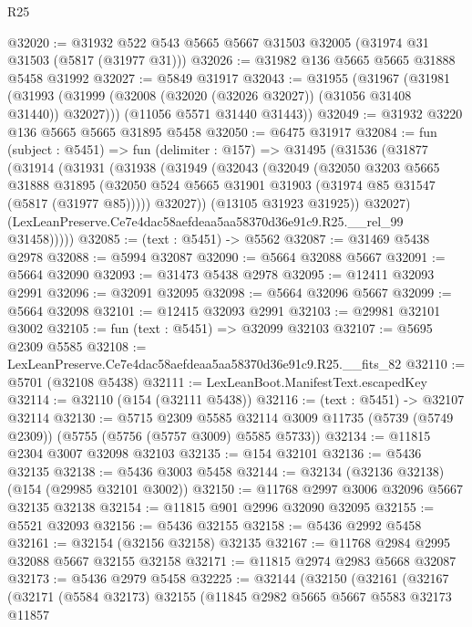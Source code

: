 \begin{lexlean}{R25}
\begin{coremodule}
@32020 := @31932 @522 @543 @5665 @5667 @31503 @32005 (@31974 @31 @31503 (@5817 (@31977 @31)))
@32026 := @31982 @136 @5665 @5665 @31888 @5458 @31992
@32027 := @5849 @31917
@32043 := @31955
    (@31967
      (@31981 (@31993 (@31999 (@32008 (@32020 (@32026 @32027)) (@31056 @31408 @31440)) @32027)))
      (@11056 @5571 @31440 @31443))
@32049 := @31932 @3220 @136 @5665 @5665 @31895 @5458
@32050 := @6475 @31917
@32084 := fun (subject : @5451) =>
  fun (delimiter : @157) =>
  @31495
    (@31536
      (@31877
        (@31914
          (@31931
            (@31938
              (@31949
                (@32043
                  (@32049
                    (@32050
                      @3203
                      @5665
                      @31888
                      @31895
                      (@32050 @524 @5665 @31901 @31903 (@31974 @85 @31547 (@5817 (@31977 @85)))))
                    @32027))
                (@13105 @31923 @31925))
              @32027)
            (LexLeanPreserve.Ce7e4dac58aefdeaa5aa58370d36e91c9.R25.__rel_99 @31458)))))
@32085 := (text : @5451) -> @5562
@32087 := @31469 @5438 @2978
@32088 := @5994 @32087
@32090 := @5664 @32088 @5667
@32091 := @5664 @32090
@32093 := @31473 @5438 @2978
@32095 := @12411 @32093 @2991
@32096 := @32091 @32095
@32098 := @5664 @32096 @5667
@32099 := @5664 @32098
@32101 := @12415 @32093 @2991
@32103 := @29981 @32101 @3002
@32105 := fun (text : @5451) => @32099 @32103
@32107 := @5695 @2309 @5585
@32108 := LexLeanPreserve.Ce7e4dac58aefdeaa5aa58370d36e91c9.R25.__fits_82
@32110 := @5701 (@32108 @5438)
@32111 := LexLeanBoot.ManifestText.escapedKey
@32114 := @32110 (@154 (@32111 @5438))
@32116 := (text : @5451) -> @32107 @32114
@32130 := @5715
    @2309
    @5585
    @32114
    @3009
    @11735
    (@5739 (@5749 @2309))
    (@5755 (@5756 (@5757 @3009) @5585 @5733))
@32134 := @11815 @2304 @3007 @32098 @32103
@32135 := @154 @32101
@32136 := @5436 @32135
@32138 := @5436 @3003 @5458
@32144 := @32134 (@32136 @32138) (@154 (@29985 @32101 @3002))
@32150 := @11768 @2997 @3006 @32096 @5667 @32135 @32138
@32154 := @11815 @901 @2996 @32090 @32095
@32155 := @5521 @32093
@32156 := @5436 @32155
@32158 := @5436 @2992 @5458
@32161 := @32154 (@32156 @32158) @32135
@32167 := @11768 @2984 @2995 @32088 @5667 @32155 @32158
@32171 := @11815 @2974 @2983 @5668 @32087
@32173 := @5436 @2979 @5458
@32225 := @32144
    (@32150
      (@32161
        (@32167
          (@32171
            (@5584 @32173)
            @32155
            (@11845
              @2982
              @5665
              @5667
              @5583
              @32173
              @11857

\end{coremodule}
\end{lexlean}
